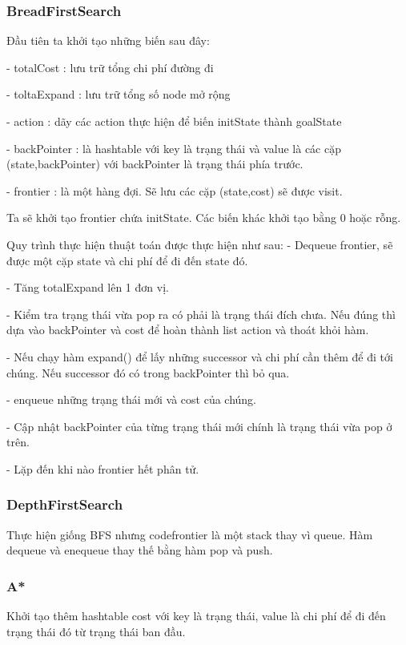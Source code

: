 \documentclass[11pt]{article} %
\begin{document}
\subsubsection{BreadFirstSearch}
Đầu tiên ta khởi tạo những biến sau đây:  

- totalCost : lưu trữ tổng chi phí đường đi  

- toltaExpand : lưu trữ tổng số node mở rộng  

- action : dãy các action thực hiện để biến initState thành goalState  

- backPointer : là hashtable với key là trạng thái và value là các cặp (state,backPointer) với backPointer là trạng thái phía trước.  

- frontier : là một hàng đợi. Sẽ lưu các cặp (state,cost) sẽ được visit.  

Ta sẽ khởi tạo frontier chứa initState. Các biến khác khởi tạo bằng 0 hoặc rỗng.  

Quy trình thực hiện thuật toán được thực hiện như sau:
- Dequeue frontier, sẽ được một cặp state và chi phí để đi đến state đó.

- Tăng totalExpand lên 1 đơn vị.  

- Kiểm tra trạng thái vừa pop ra có phải là trạng thái đích chưa. Nếu đúng thì dựa vào backPointer và cost để hoàn thành list action và thoát khỏi hàm.  

- Nếu chạy hàm expand() để lấy những successor và chi phí cần thêm để đi tới chúng. Nếu successor đó có trong backPointer thì bỏ qua.

- enqueue những trạng thái mới và cost của chúng.

- Cập nhật backPointer của từng trạng thái mới chính là trạng thái vừa pop ở trên.

- Lặp đến khi nào frontier hết phân tử.

\subsubsection{DepthFirstSearch}

Thực hiện giống BFS nhưng code{frontier} là một stack thay vì queue. Hàm dequeue và enequeue thay thế bằng hàm pop và push.

\subsubsection{A*}
Khởi tạo thêm hashtable cost với key là trạng thái, value là chi phí để đi đến trạng thái đó từ trạng thái ban đầu.
\end{document}
